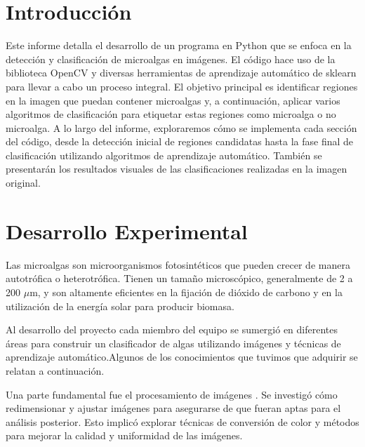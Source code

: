 \documentclass[conference]{IEEEtran}
\begin{document}



\section{Introducción}
Este informe detalla el desarrollo de un programa en Python que se enfoca en la detección y clasificación de microalgas en imágenes. El código hace uso de la biblioteca OpenCV\cite{opencv} y diversas herramientas de aprendizaje automático de sklearn\cite{sklearn} para llevar a cabo un proceso integral. El objetivo principal es identificar regiones en la imagen que puedan contener microalgas y, a continuación, aplicar varios algoritmos de clasificación para etiquetar estas regiones como microalga o no microalga. A lo largo del informe, exploraremos cómo se implementa cada sección del código, desde la detección inicial de regiones candidatas hasta la fase final de clasificación utilizando algoritmos de aprendizaje automático. También se presentarán los resultados visuales de las clasificaciones realizadas en la imagen original.



\section{Desarrollo Experimental}
Las microalgas\cite{MicroAlgas} son microorganismos fotosintéticos que pueden crecer de manera autotrófica o heterotrófica. Tienen un tamaño microscópico, generalmente de 2 a 200 $\mu$m, y son altamente eficientes en la fijación de dióxido de carbono y en la utilización de la energía solar para producir biomasa.


Al desarrollo del proyecto cada miembro del equipo se sumergió en diferentes áreas para construir un clasificador de algas utilizando imágenes y técnicas de aprendizaje automático.Algunos de los conocimientos que tuvimos que adquirir se relatan a continuación.

Una parte fundamental fue el procesamiento de imágenes \cite{morales2011procesamiento}. Se investigó cómo redimensionar y ajustar imágenes para asegurarse de que fueran aptas para el análisis posterior. Esto implicó explorar técnicas de conversión de color y métodos para mejorar la calidad y uniformidad de las imágenes.
\end{document}
